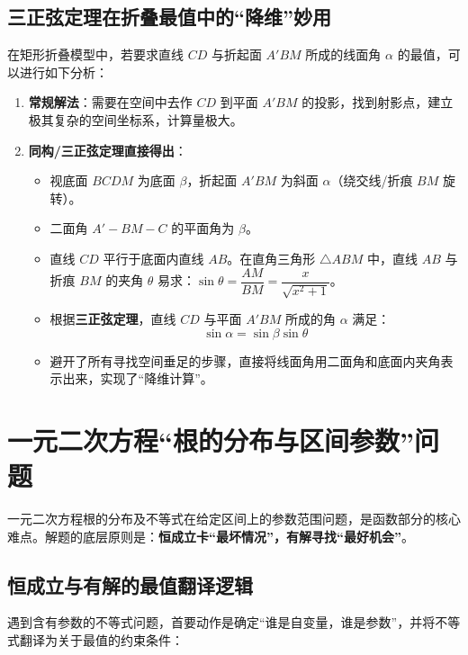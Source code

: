 \documentclass[11pt,a4paper]{ctexart}
\begin{document}
\subsection{三正弦定理在折叠最值中的“降维”妙用}
在矩形折叠模型中，若要求直线 $CD$ 与折起面 $A'BM$ 所成的线面角 $\alpha$ 的最值，可以进行如下分析：
\begin{enumerate}
  \item \textbf{常规解法}：需要在空间中去作 $CD$ 到平面 $A'BM$ 的投影，找到射影点，建立极其复杂的空间坐标系，计算量极大。
  \item \textbf{同构/三正弦定理直接得出}：
    \begin{itemize}
      \item 视底面 $BCDM$ 为底面 $\beta$，折起面 $A'BM$ 为斜面 $\alpha$（绕交线/折痕 $BM$ 旋转）。
      \item 二面角 $A'-BM-C$ 的平面角为 $\beta$。
      \item 直线 $CD$ 平行于底面内直线 $AB$。在直角三角形 $\triangle ABM$ 中，直线 $AB$ 与折痕 $BM$ 的夹角 $\theta$ 易求：$\sin\theta = \dfrac{AM}{BM} = \dfrac{x}{\sqrt{x^2+1}}$。
      \item 根据\textbf{三正弦定理}，直线 $CD$ 与平面 $A'BM$ 所成的角 $\alpha$ 满足：
        \[ \sin\alpha = \sin\beta \sin\theta \]
      \item 避开了所有寻找空间垂足的步骤，直接将线面角用二面角和底面内夹角表示出来，实现了“降维计算”。
    \end{itemize}
\end{enumerate}

\newpage

\section{一元二次方程“根的分布与区间参数”问题}

一元二次方程根的分布及不等式在给定区间上的参数范围问题，是函数部分的核心难点。解题的底层原则是：\textbf{恒成立卡“最坏情况”，有解寻找“最好机会”}。

\subsection{恒成立与有解的最值翻译逻辑}
遇到含有参数的不等式问题，首要动作是确定“谁是自变量，谁是参数”，并将不等式翻译为关于最值的约束条件：
\end{document}

